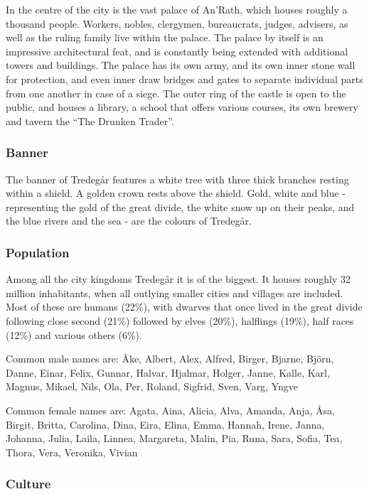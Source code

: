 In the centre of the city is the vast palace of An'Rath, which houses roughly
a thousand people. Workers, nobles, clergymen, bureaucrats, judges, advisers,
as well as the ruling family live within the palace. The palace by itself is
an impressive architectural feat, and is constantly being extended with
additional towers and buildings. The palace has its own army, and its own
inner stone wall for protection, and even inner draw bridges and gates to
separate individual parts from one another in case of a siege. The outer ring
of the castle is open to the public, and houses a library, a school that
offers various courses, its own brewery and tavern the ``The Drunken Trader''.

\subsubsection{Banner}

The banner of Tredegår features a white tree with three thick branches resting
within a shield. A golden crown rests above the shield. Gold, white and blue -
representing the gold of the great divide, the white snow up on their peaks,
and the blue rivers and the sea - are the colours of Tredegår.

\subsubsection{Population}

Among all the city kingdoms Tredegår it is of the biggest. It houses roughly
32 million inhabitants, when all outlying smaller cities and villages are
included. Most of these are humans (22\%), with dwarves that once lived in the
great divide following close second (21\%) followed by elves (20\%), halflings
(19\%), half races (12\%) and various others (6\%).

Common male names are: Åke, Albert, Alex, Alfred, Birger, Bjarne, Björn, Danne,
Einar, Felix, Gunnar, Halvar, Hjalmar, Holger, Janne, Kalle, Karl, Magnus,
Mikael, Nils, Ola, Per, Roland, Sigfrid, Sven, Varg, Yngve

Common female names are: Agata, Aina, Alicia, Alva, Amanda, Anja, Åsa, Birgit,
Britta, Carolina, Dina, Eira, Elina, Emma, Hannah, Irene, Janna, Johanna,
Julia, Laila, Linnea, Margareta, Malin, Pia, Runa, Sara, Sofia, Tea, Thora,
Vera, Veronika, Vivian

\subsubsection{Culture}

